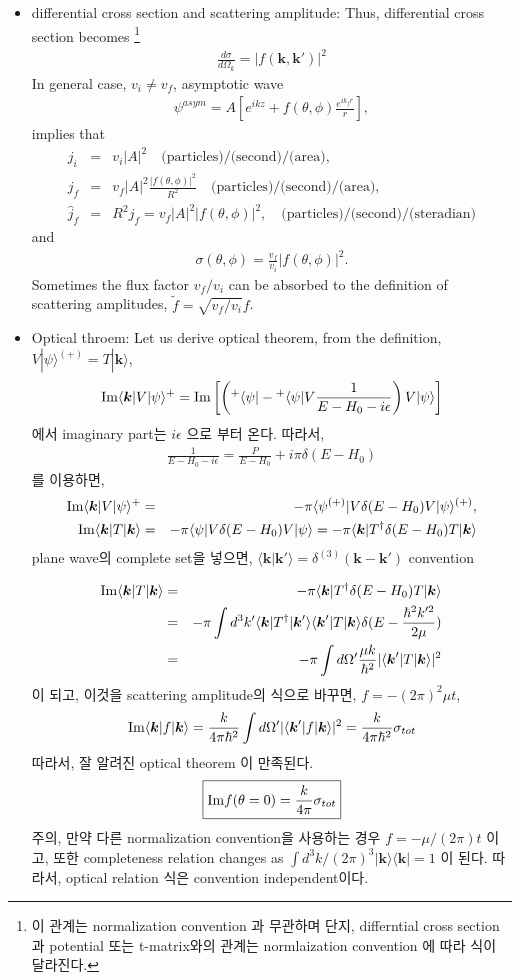 \documentclass[10pt]{article}
\def\bm{\boldsymbol}
\newcommand{\bea}{\begin{eqnarray}}
\newcommand{\eea}{\end{eqnarray}}
\newcommand{\no}{\nonumber \\}
\def\vk{{\bm k}}
\def\la{\langle}
\def\ra{\rangle}
\begin{document}
\begin{itemize}
\item differential cross section and scattering amplitude:
Thus,
differential cross section becomes 
\footnote{
이 관계는 normalization convention 과 무관하며
단지, differntial cross section과 potential 또는 t-matrix와의
관계는 normlaization convention 에 따라 식이 달라진다.}\bea
\frac{d\sigma}{d\Omega_k}=|f(\vk,\vk')|^2
\eea
In general case, $v_i\neq v_f$, asymptotic wave
\bea
\psi^{asym}=A[e^{ikz}+f(\theta,\phi)\frac{e^{ik_f r}}{r}],
\eea
implies that
\bea
j_i &=& v_i |A|^2\quad  \mbox{(particles)/(second)/(area)},\no 
j_f &=& v_f |A|^2 \frac{|f(\theta,\phi)|^2}{R^2} \quad \mbox{(particles)/(second)/(area)},\no 
\hat{j}_f &=& R^2 j_f=v_f |A|^2 |f(\theta,\phi)|^2, \quad \mbox{(particles)/(second)/(steradian)}
\eea 
and
\bea
\sigma(\theta,\phi)=\frac{v_f}{v_i}|f(\theta,\phi)|^2.
\eea
Sometimes the flux factor $v_f/v_i$ can be absorbed to 
the definition of scattering amplitudes, $\tilde{f}=\sqrt{v_f/v_i} f$.



\item Optical throem: 
Let us derive optical theorem, from the definition,
$V|\psi\ra^{(+)}=T|\vk\ra$,
\bea
{\rm Im}\la \vk|V|\psi\ra^+={\rm Im}\left[
\left({}^+\la\psi|-{}^+\la\psi|V\frac{1}{E-H_0-i\epsilon}\right)V|\psi\ra
\right]
\eea
에서 imaginary part는 $i\epsilon$ 으로 부터 온다. 따라서,
\bea
\frac{1}{E-H_0-i\epsilon}=\frac{P}{E-H_0}+i\pi\delta(E-H_0)
\eea 
를 이용하면,
\bea
{\rm Im}\la \vk|V|\psi\ra^+
&=&-\pi{}\la\psi^{(+)}|V\delta(E-H_0)V|\psi\ra^{(+)},\no
{\rm Im}\la \vk|T|\vk\ra
&=&-\pi\la\psi|V\delta(E-H_0)V|\psi\ra
   =-\pi\la\vk|T^\dagger\delta(E-H_0)T|\vk\ra
\eea
plane wave의 complete set을 넣으면,
$\la \vk|\vk'\ra=\delta^{(3)}(\vk-\vk')$ convention

\bea
{\rm Im}\la \vk|T|\vk\ra
&=&-\pi\la\vk|T^\dagger\delta(E-H_0)T|\vk\ra\no
&=&-\pi\int d^3k'\la \vk|T^\dagger|\vk'\ra 
                     \la \vk'|T|\vk\ra
                  \delta(E-\frac{\hbar^2 k'^2}{2\mu})\no 
 &=&-\pi\int d\Omega' 
    \frac{\mu k}{\hbar^2}|\la \vk'|T|\vk\ra|^2
\eea
이 되고, 이것을 scattering amplitude의 식으로 바꾸면,
$f=-(2\pi)^2\mu t$,
\bea
{\rm Im}\la \vk|f|\vk\ra
=\frac{k}{4\pi\hbar^2}\int d\Omega'
 |\la \vk'|f|\vk\ra|^2 
= \frac{k}{4\pi\hbar^2} \sigma_{tot}
\eea
따라서, 잘 알려진 optical theorem 이 만족된다.
\bea
\boxed{
{\rm Im}f(\theta=0)=\frac{k}{4\pi}\sigma_{tot}}
\eea
주의, 만약 다른 normalization convention을 사용하는 경우
$f=-\mu/(2\pi) t$ 이고, 또한 completeness relation changes
as $\int d^3 k/(2\pi)^3 |\vk\ra\la \vk|=1$ 이 된다.
따라서, optical relation 식은 convention independent이다.
\end{itemize}
\end{document}
